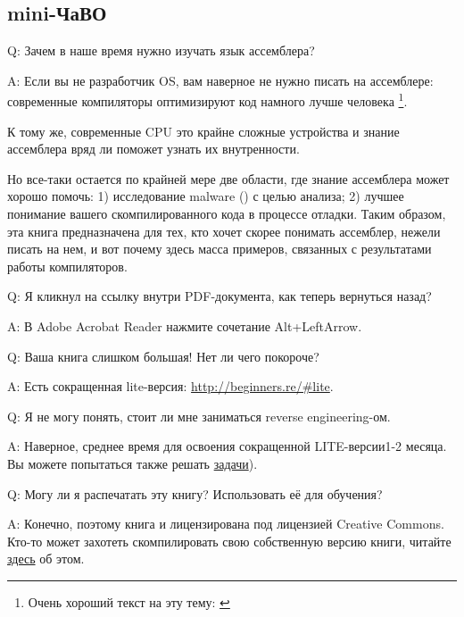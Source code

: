 \newcommand{\HACKINGMdURL}{https://github.com/dennis714/RE-for-beginners/blob/master/HACKING.md}
\newcommand{\FNURLREDDIT}{\footnote{\href{http://go.yurichev.com/17027}{reddit.com/r/ReverseEngineering/}}}
\newcommand{\LITEURL}{\url{http://beginners.re/\#lite}}

\ifdefined\RUSSIAN
\subsection*{mini-ЧаВО}

\par Q: Зачем в наше время нужно изучать язык ассемблера?
\par A: Если вы не разработчик \ac{OS}, вам наверное не нужно писать на ассемблере: современные компиляторы оптимизируют код намного лучше человека
\footnote{Очень хороший текст на эту тему: \cite{AgnerFog}}.

К тому же, современные \ac{CPU} это крайне сложные устройства и знание ассемблера вряд ли
поможет узнать их внутренности.

Но все-таки остается по крайней мере две области, где знание ассемблера может хорошо помочь:
1) исследование malware () с целью анализа; 2) лучшее понимание
вашего скомпилированного кода в процессе отладки.
Таким образом, эта книга предназначена для тех, кто хочет скорее понимать ассемблер,
нежели писать на нем, и вот почему здесь масса примеров, связанных с результатами
работы компиляторов.

\par Q: Я кликнул на ссылку внутри PDF-документа, как теперь вернуться назад?
\par A: В Adobe Acrobat Reader нажмите сочетание Alt+LeftArrow.

\ifx\LITE\undefined
\par Q: Ваша книга слишком большая! Нет ли чего покороче?
\par A: Есть сокращенная lite-версия: \LITEURL{}.
\fi

\par Q: Я не могу понять, стоит ли мне заниматься reverse engineering-ом.
\par A: Наверное, среднее время для освоения сокращенной LITE-версии\EMDASH{}1-2 месяца. Вы можете попытаться также решать \href{http://challenges.re/}{задачи}).

\par Q: Могу ли я распечатать эту книгу? Использовать её для обучения?
\par A: Конечно, поэтому книга и лицензирована под лицензией Creative Commons. Кто-то может захотеть скомпилировать свою собственную версию книги, читайте \href{\HACKINGMdURL}{здесь} об этом.

